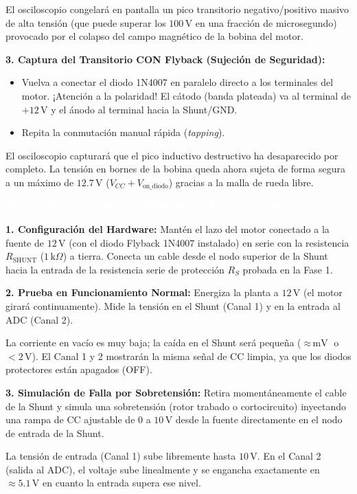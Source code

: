 \documentclass[11pt, a4paper]{article}
\newcommand{\phase}[1]{\vspace{0.4cm}\noindent\colorbox{ucbblue}{\textcolor{white}{\textbf{\large #1}}}\vspace{0.2cm}}
\newcommand{\subphase}[1]{\vspace{0.2cm}\noindent\textbf{\textcolor{ucbblue}{#1}}\vspace{0.1cm}}
\begin{document}
\begin{expected}
El osciloscopio congelará en pantalla un pico transitorio negativo/positivo masivo de alta tensión (que puede superar los $100\,\text{V}$ en una fracción de microsegundo) provocado por el colapso del campo magnético de la bobina del motor.
\end{expected}

\subphase{3. Captura del Transitorio CON Flyback (Sujeción de Seguridad):}
\begin{itemize}[leftmargin=*]
    \item Vuelva a conectar el diodo 1N4007 en paralelo directo a los terminales del motor. ¡Atención a la polaridad! El cátodo (banda plateada) va al terminal de $+12\,\text{V}$ y el ánodo al terminal hacia la Shunt/GND.
    \item Repita la conmutación manual rápida (\textit{tapping}).
\end{itemize}

\begin{expected}
El osciloscopio capturará que el pico inductivo destructivo ha desaparecido por completo. La tensión en bornes de la bobina queda ahora sujeta de forma segura a un máximo de $12.7\,\text{V}$ ($V_{CC} + V_{\text{on\_diodo}}$) gracias a la malla de rueda libre.
\end{expected}

\vspace{0.2cm}
\phase{Fase 3: Integración Total y Simulación de Fallas de Corriente}

\subphase{1. Configuración del Hardware:}
Mantén el lazo del motor conectado a la fuente de $12\,\text{V}$ (con el diodo Flyback 1N4007 instalado) en serie con la resistencia $R_{\text{SHUNT}}$ ($1\,\text{k}\Omega$) a tierra. Conecta un cable desde el nodo superior de la Shunt hacia la entrada de la resistencia serie de protección $R_S$ probada en la Fase 1.

\subphase{2. Prueba en Funcionamiento Normal:}
Energiza la planta a $12\,\text{V}$ (el motor girará continuamente). Mide la tensión en el Shunt (Canal 1) y en la entrada al ADC (Canal 2).
\begin{expected}
La corriente en vacío es muy baja; la caída en el Shunt será pequeña ($\approx\,\text{mV}$ o $<2\,\text{V}$). El Canal 1 y 2 mostrarán la misma señal de CC limpia, ya que los diodos protectores están apagados (OFF).
\end{expected}

\subphase{3. Simulación de Falla por Sobretensión:}
Retira momentáneamente el cable de la Shunt y simula una sobretensión (rotor trabado o cortocircuito) inyectando una rampa de CC ajustable de $0$ a $10\,\text{V}$ desde la fuente directamente en el nodo de entrada de la Shunt.
\begin{expected}
La tensión de entrada (Canal 1) sube libremente hasta $10\,\text{V}$. En el Canal 2 (salida al ADC), el voltaje sube linealmente y se engancha exactamente en $\approx 5.1\,\text{V}$ en cuanto la entrada supera ese nivel.
\end{expected}
\end{document}
